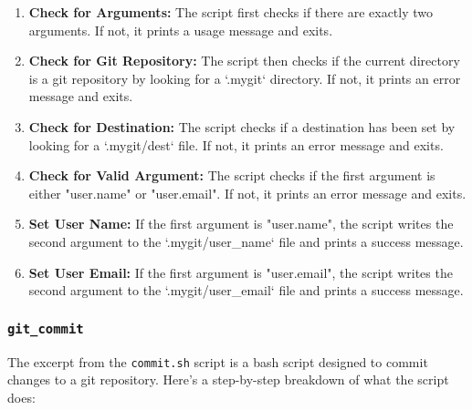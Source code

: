 \documentclass{article}
\begin{document}
\begin{enumerate}
    \item \textbf{Check for Arguments:} The script first checks if there are exactly two arguments. If not, it prints a usage message and exits.
    
    \item \textbf{Check for Git Repository:} The script then checks if the current directory is a git repository by looking for a `.mygit` directory. If not, it prints an error message and exits.
    
    \item \textbf{Check for Destination:} The script checks if a destination has been set by looking for a `.mygit/dest` file. If not, it prints an error message and exits.
    
    \item \textbf{Check for Valid Argument:} The script checks if the first argument is either "user.name" or "user.email". If not, it prints an error message and exits.
    
    \item \textbf{Set User Name:} If the first argument is "user.name", the script writes the second argument to the `.mygit/user\_name` file and prints a success message.
    
    \item \textbf{Set User Email:} If the first argument is "user.email", the script writes the second argument to the `.mygit/user\_email` file and prints a success message.
\end{enumerate}

\subsubsection{\texttt{git\_commit}}
The excerpt from the \texttt{commit.sh} script is a bash script designed to commit changes to a git repository. Here's a step-by-step breakdown of what the script does:
\end{document}
